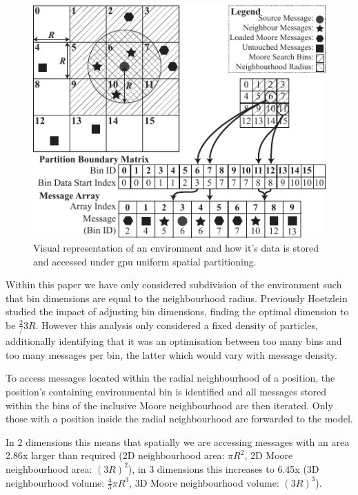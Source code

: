\begin{figure}[!t]
\centering
\includegraphics[width=\linewidth]{../resources/usp/usp.pdf}
\caption{\label{fig:uniform-spatial-partitioning}%
Visual representation of an environment and how it's data is stored and accessed under \gls{gpu} uniform spatial partitioning.
}
\end{figure}

Within this paper we have only considered subdivision of the environment such that bin dimensions are equal to the neighbourhood radius. Previously Hoetzlein studied the impact of adjusting bin dimensions, finding the optimal dimension to be $\frac{2}/{3}R$\cite{Hoe14}. However this analysis only considered a fixed density of particles, additionally identifying that it was an optimisation between too many bins and too many messages per bin, the latter which would vary with message density.

To access messages located within the radial neighbourhood of a position, the position's containing environmental bin is identified and all messages stored within the bins of the inclusive Moore neighbourhood are then iterated. Only those with a position inside the radial neighbourhood are forwarded to the model.

In 2 dimensions this means that spatially we are accessing messages with an area 2.86x larger than required (2D neighbourhood area: $\pi R^{2}$, 2D Moore neighbourhood area: $(3R)^{2}$), in 3 dimensions this increases to 6.45x (3D neighbourhood volume: $\frac{4}{3}\pi R^{3}$, 3D Moore neighbourhood volume: $(3R)^{3}$).

